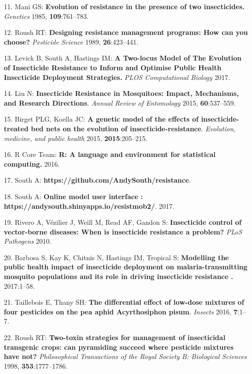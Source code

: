 \documentclass[11pt,]{article}
\begin{document}
\hypertarget{ref-Mani1985}{}
11. Mani GS: \textbf{Evolution of resistance in the presence of two
insecticides.} \emph{Genetics} 1985, \textbf{109}:761--783.

\hypertarget{ref-Roush1989}{}
12. Roush RT: \textbf{Designing resistance management programs: How can
you choose?} \emph{Pesticide Science} 1989, \textbf{26}:423--441.

\hypertarget{ref-Levick2017}{}
13. Levick B, South A, Hastings IM: \textbf{A Two-locus Model of The
Evolution of Insecticide Resistance to Inform and Optimise Public Health
Insecticide Deployment Strategies.} \emph{PLOS Computational Biology}
2017.

\hypertarget{ref-Liu2015}{}
14. Liu N: \textbf{Insecticide Resistance in Mosquitoes: Impact,
Mechanisms, and Research Directions}. \emph{Annual Review of Entomology}
2015, \textbf{60}:537--559.

\hypertarget{ref-Birget2015}{}
15. Birget PLG, Koella JC: \textbf{A genetic model of the effects of
insecticide-treated bed nets on the evolution of
insecticide-resistance}. \emph{Evolution, medicine, and public health}
2015, \textbf{2015}:205--215.

\hypertarget{ref-RCoreTeam2016}{}
16. R Core Team: \textbf{R: A language and environment for statistical
computing.} 2016.

\hypertarget{ref-South2017}{}
17. South A: \textbf{https://github.com/AndySouth/resistance}.

\hypertarget{ref-South2017a}{}
18. South A: \textbf{Online model user interface :
https://andysouth.shinyapps.io/resistmob2/}. 2017.

\hypertarget{ref-Rivero2010}{}
19. Rivero A, Vézilier J, Weill M, Read AF, Gandon S:
\textbf{Insecticide control of vector-borne diseases: When is
insecticide resistance a problem?} \emph{PLoS Pathogens} 2010.

\hypertarget{ref-Barbosa2017}{}
20. Barbosa S, Kay K, Chitnis N, Hastings IM, Tropical S:
\textbf{Modelling the public health impact of insecticide deployment on
malaria-transmitting mosquito populations and its role in driving
insecticide resistance .} 2017:1--58.

\hypertarget{ref-Taillebois2016}{}
21. Taillebois E, Thany SH: \textbf{The differential effect of low-dose
mixtures of four pesticides on the pea aphid Acyrthosiphon pisum}.
\emph{Insects} 2016, \textbf{7}:1--7.

\hypertarget{ref-Roush1998}{}
22. Roush RT: \textbf{Two-toxin strategies for management of
insecticidal transgenic crops: can pyramiding succeed where pesticide
mixtures have not?} \emph{Philosophical Transactions of the Royal
Society B: Biological Sciences} 1998, \textbf{353}:1777--1786.
\end{document}
